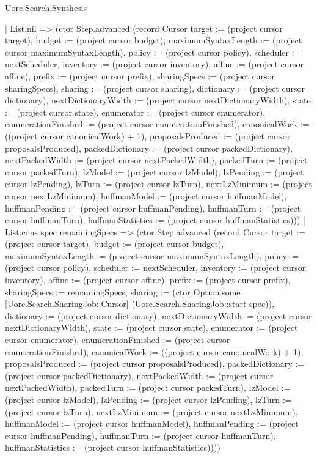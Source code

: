 \begin{lexlean}{Uorc.Search.Synthesis}
\begin{semanticmodule}
{          | List.nil => (ctor Step.advanced (record Cursor {target := (project cursor target), budget := (project cursor budget), maximumSyntaxLength := (project cursor maximumSyntaxLength), policy := (project cursor policy), scheduler := nextScheduler, inventory := (project cursor inventory), affine := (project cursor affine), prefix := (project cursor prefix), sharingSpecs := (project cursor sharingSpecs), sharing := (project cursor sharing), dictionary := (project cursor dictionary), nextDictionaryWidth := (project cursor nextDictionaryWidth), state := (project cursor state), enumerator := (project cursor enumerator), enumerationFinished := (project cursor enumerationFinished), canonicalWork := ((project cursor canonicalWork) + 1), proposalsProduced := (project cursor proposalsProduced), packedDictionary := (project cursor packedDictionary), nextPackedWidth := (project cursor nextPackedWidth), packedTurn := (project cursor packedTurn), lzModel := (project cursor lzModel), lzPending := (project cursor lzPending), lzTurn := (project cursor lzTurn), nextLzMinimum := (project cursor nextLzMinimum), huffmanModel := (project cursor huffmanModel), huffmanPending := (project cursor huffmanPending), huffmanTurn := (project cursor huffmanTurn), huffmanStatistics := (project cursor huffmanStatistics)}))
          | List.cons spec remainingSpecs => (ctor Step.advanced (record Cursor {target := (project cursor target), budget := (project cursor budget), maximumSyntaxLength := (project cursor maximumSyntaxLength), policy := (project cursor policy), scheduler := nextScheduler, inventory := (project cursor inventory), affine := (project cursor affine), prefix := (project cursor prefix), sharingSpecs := remainingSpecs, sharing := (ctor Option.some [Uorc.Search.SharingJob::Cursor] (Uorc.Search.SharingJob::start spec)), dictionary := (project cursor dictionary), nextDictionaryWidth := (project cursor nextDictionaryWidth), state := (project cursor state), enumerator := (project cursor enumerator), enumerationFinished := (project cursor enumerationFinished), canonicalWork := ((project cursor canonicalWork) + 1), proposalsProduced := (project cursor proposalsProduced), packedDictionary := (project cursor packedDictionary), nextPackedWidth := (project cursor nextPackedWidth), packedTurn := (project cursor packedTurn), lzModel := (project cursor lzModel), lzPending := (project cursor lzPending), lzTurn := (project cursor lzTurn), nextLzMinimum := (project cursor nextLzMinimum), huffmanModel := (project cursor huffmanModel), huffmanPending := (project cursor huffmanPending), huffmanTurn := (project cursor huffmanTurn), huffmanStatistics := (project cursor huffmanStatistics)})))
}
\end{semanticmodule}
\end{lexlean}
